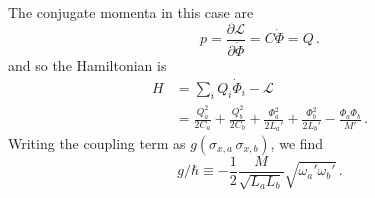 The conjugate momenta in this case are
\begin{equation*}
  p = \frac{\partial \mathcal{L}}{\partial \dot{\Phi}} = C \dot{\Phi} = Q \, .
\end{equation*}
and so the Hamiltonian is
\begin{align}
  H
  &= \sum_i Q_i \dot{\Phi}_i - \mathcal{L} \nonumber \\
  &=
    \frac{Q_a^2}{2 C_a} + \frac{Q_b^2}{2 C_b}
    + \frac{\Phi_a^2}{2L_a'} + \frac{\Phi_b^2}{2L_b'}
    - \frac{\Phi_a \Phi_b}{M'}
  \, .
\end{align}
Writing the coupling term as $g (\sigma_{x,a} \, \sigma_{x,b})$, we find
\begin{equation}
  g/\hbar \equiv - \frac{1}{2} \frac{M}{\sqrt{L_a L_b}} \sqrt{\omega_a' \omega_b'}
  \, .
\end{equation}
